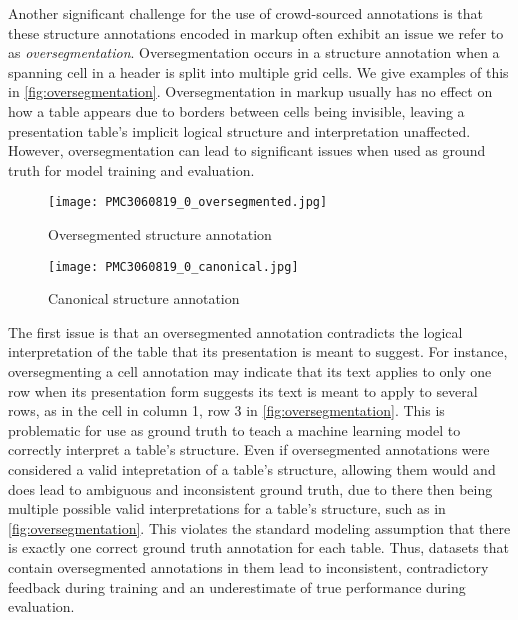 \documentclass[10pt,twocolumn,letterpaper]{article}
\begin{document}
Another significant challenge for the use of crowd-sourced annotations is that these structure annotations encoded in markup often exhibit an issue we refer to as \emph{oversegmentation}.
Oversegmentation occurs in a structure annotation when a spanning cell in a header is split into multiple grid cells.
We give examples of this in \cref{fig:oversegmentation}.
Oversegmentation in markup usually has no effect on how a table appears due to borders between cells being invisible, leaving a presentation table's implicit logical structure and interpretation unaffected.
However, oversegmentation can lead to significant issues when used as ground truth for model training and evaluation.

\begin{figure*}[]
  \centering
  \begin{subfigure}[b]{0.49\linewidth}
	\centering
	\texttt{[image: PMC3060819\_0\_oversegmented.jpg]}
    \caption{Oversegmented structure annotation}
    \label{subfig:oversegmentation.1}
  \end{subfigure}
  \begin{subfigure}[b]{0.49\linewidth}
	\centering
	\texttt{[image: PMC3060819\_0\_canonical.jpg]}
    \caption{Canonical structure annotation}
    \label{subfig:oversegmentation.2}
  \end{subfigure}
  \caption{In the above example, the structure annotation on the left is \emph{oversegmented}, creating extra blank cells in the headers. The canonical structure annotation on the right merges these cells and captures its true logical structure.}
  \label{fig:oversegmentation}
\end{figure*}

The first issue is that an oversegmented annotation contradicts the logical interpretation of the table that its presentation is meant to suggest.
For instance, oversegmenting a cell annotation may indicate that its text applies to only one row when its presentation form suggests its text is meant to apply to several rows, as in the cell in column 1, row 3 in \cref{fig:oversegmentation}.
This is problematic for use as ground truth to teach a machine learning model to correctly interpret a table's structure.
Even if oversegmented annotations were considered a valid intepretation of a table's structure, allowing them would and does lead to ambiguous and inconsistent ground truth, due to there then being multiple possible valid interpretations for a table's structure, such as in \cref{fig:oversegmentation}.
This violates the standard modeling assumption that there is exactly one correct ground truth annotation for each table.
Thus, datasets that contain oversegmented annotations in them lead to inconsistent, contradictory feedback during training and an underestimate of true performance during evaluation.
\end{document}
